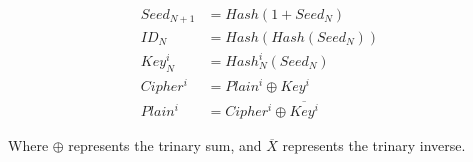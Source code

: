 \documentclass[11pt]{IEEEtran}
\begin{document}
\begin{align}
Seed_{N+1} &= Hash ( 1 + Seed_N) \\
ID_N &= Hash(Hash(Seed_N) ) \\
Key_{N}^i &= Hash_{N}^i(Seed_N) \\
Cipher^i &= Plain^i \oplus Key^i \\
Plain^i &= Cipher^i \oplus \overline{Key^i}
\end{align}

Where $\oplus$ represents the trinary sum, and $\overline{X}$ represents the trinary inverse.
\end{document}
